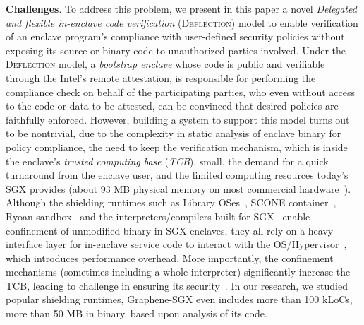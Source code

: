 \vspace{3pt}\noindent\textbf{Challenges}. To address this problem, we present in this paper a novel \textit{Delegated and flexible in-enclave code verification} (\textsc{Deflection}) model to enable verification of an enclave program's compliance with user-defined security policies without exposing its source or binary code to unauthorized parties involved. Under the \textsc{Deflection} model, a \textit{bootstrap enclave} whose code is public and verifiable through the Intel's remote attestation, is responsible for performing the compliance check on behalf of the participating parties, who even without access to the code or data to be attested, can be convinced that desired policies are faithfully enforced.  
However, building a system to support this model turns out to be nontrivial, due to the complexity in static analysis of enclave binary for policy compliance, the need to keep the verification mechanism, which is inside the enclave's \textit{trusted computing base} (\textit{TCB}), small, the demand for a quick turnaround from the enclave user, and the limited computing resources today's SGX provides (about 93 MB physical memory on most commercial hardware~\cite{chakrabarti2019scaling}). 
Although the shielding runtimes such as Library OSes~\cite{priebe2019sgx,shen2020occlum},  SCONE container~\cite{arnautov2016scone}, Ryoan sandbox~\cite{hunt2018ryoan} and the interpreters/compilers built for SGX~\cite{wang2019towards,wang2019running} enable confinement of unmodified binary in SGX  enclaves, they all rely on a heavy interface layer for in-enclave service code to interact with the OS/Hypervisor~\cite{lazard2018teeshift}, which introduces performance overhead. More importantly, the confinement mechanisms (sometimes including a whole interpreter) significantly increase the TCB, leading to \DIFdelbegin {}\DIFdelend \DIFaddbegin {}\DIFaddend challenge in ensuring its security~\cite{van2019tale}. In our research, we studied popular shielding runtimes, Graphene-SGX even includes more than 100 kLoCs, more than 50 MB in binary, based upon analysis of its code.



